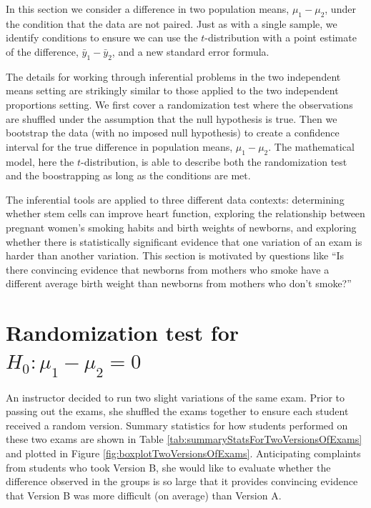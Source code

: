 \documentclass[
  10pt,
  openany]{book}
\theoremstyle{definition}
\theoremstyle{definition}
\theoremstyle{definition}
\theoremstyle{definition}
\theoremstyle{remark}
\begin{document}
In this section we consider a difference in
two population means, \(\mu_1 - \mu_2\), under the condition
that the data are not paired.
Just as with a single sample, we identify conditions to ensure
we can use the \(t\)-distribution with a point estimate
of the difference, \(\bar{y}_1 - \bar{y}_2\),
and a new standard error formula.

The details for working through inferential problems in the two independent means setting are strikingly similar to those applied to the two independent proportions setting.
We first cover a randomization test where the observations are shuffled under the assumption that the null hypothesis is true.
Then we bootstrap the data (with no imposed null hypothesis) to create a confidence interval for the true difference in population means, \(\mu_1 - \mu_2\).
The mathematical model, here the \(t\)-distribution, is able to describe both the randomization test and the boostrapping as long as the conditions are met.

The inferential tools are applied to three different data contexts: determining whether
stem cells can improve heart function,
exploring the relationship between pregnant women's smoking
habits and birth weights of newborns,
and exploring whether there is statistically significant
evidence that one variation of an exam is harder than
another variation.
This section is motivated by questions like
``Is there convincing evidence that newborns from mothers
who smoke have a different average birth weight than newborns
from mothers who don't smoke?''

\section{\texorpdfstring{Randomization test for \(H_0: \mu_1 - \mu_2 = 0\)}{Randomization test for H\_0: \textbackslash mu\_1 - \textbackslash mu\_2 = 0}}\label{rand2mean}


An instructor decided to run two slight variations of the same exam. Prior to passing out the exams, she shuffled the exams together to ensure each student received a random version. Summary statistics for how students performed on these two exams are shown in Table \ref{tab:summaryStatsForTwoVersionsOfExams} and plotted in Figure \ref{fig:boxplotTwoVersionsOfExams}. Anticipating complaints from students who took Version B, she would like to evaluate whether the difference observed in the groups is so large that it provides convincing evidence that Version B was more difficult (on average) than Version A.
\end{document}
